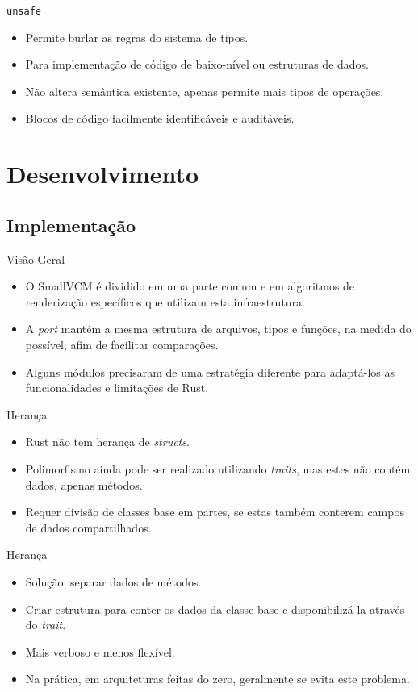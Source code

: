 \documentclass{beamer}
\begin{document}
\begin{frame}{\texttt{unsafe}}
	\begin{itemize}
		\item Permite burlar as regras do sistema de tipos.
		\item Para implementação de código de baixo-nível ou estruturas de dados.
		\item Não altera semântica existente, apenas permite mais tipos de operações.
		\item Blocos de código facilmente identificáveis e auditáveis.
	\end{itemize}
\end{frame}

\section{Desenvolvimento}
\subsection{Implementação}
\begin{frame}{Visão Geral}
	\begin{itemize}
		\item O SmallVCM é dividido em uma parte comum e em algoritmos de renderização específicos que utilizam esta infraestrutura.
		\item A \emph{port} mantém a mesma estrutura de arquivos, tipos e funções, na medida do possível, afim de facilitar comparações.
		\item Alguns módulos precisaram de uma estratégia diferente para adaptá-los as funcionalidades e limitações de Rust.
	\end{itemize}
\end{frame}

\begin{frame}{Herança}
	\begin{itemize}
		\item Rust não tem herança de \emph{structs}.
		\item Polimorfismo ainda pode ser realizado utilizando \emph{traits}, mas estes não contém dados, apenas métodos.
		\item Requer divisão de classes base em partes, se estas também conterem campos de dados compartilhados.
	\end{itemize}
\end{frame}

\begin{frame}{Herança}
	\begin{itemize}
		\item Solução: separar dados de métodos.
		\item Criar estrutura para conter os dados da classe base e disponibilizá-la através do \emph{trait}.
		\item Mais verboso e menos flexível.
		\item Na prática, em arquiteturas feitas do zero, geralmente se evita este problema.
	\end{itemize}
\end{frame}
\end{document}
